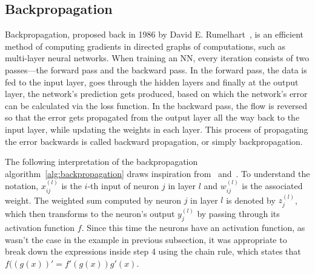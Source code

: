 \subsection*{Backpropagation}
\label{backpropagation}
Backpropagation, proposed back in 1986 by David E. Rumelhart~\cite{rumelhart1986learning},
is an efficient method of computing gradients in directed graphs of computations,
such as multi-layer neural networks.
When training an NN, every iteration consists of two passes---the forward pass and
the backward pass. In the forward pass, the data is fed to the input layer, goes through
the hidden layers and finally at the output layer, the network's prediction gets produced,
based on which the network's error can be calculated via the loss function.
In the backward pass, the flow is reversed so that the error gets propagated from the output
layer all the way back to the input layer, while updating the weights in each layer.
This process of propagating the error backwards is called backward propagation, or simply backpropagation.

The following interpretation of the backpropagation algorithm~\ref{alg:backpropagation}
draws inspiration from~\cite{FITMT16598} and~\cite{FITBT21764}.
To understand the notation, $x_{ij}^{(l)}$ is the $i$-th input of neuron $j$ in layer $l$
and $w_{ij}^{(l)}$ is the associated weight.
The weighted sum computed by neuron $j$ in layer $l$ is denoted by $z_j^{(l)}$, which then transforms to
the neuron's output $y_j^{(l)}$ by passing through its activation function $f$.
Since this time the neurons have an activation function, as wasn't the case in the example in previous subsection,
it was appropriate to break down the expressions inside step 4 using the chain rule,
which states that $f((g(x))' = f'(g(x)) g'(x)$.

